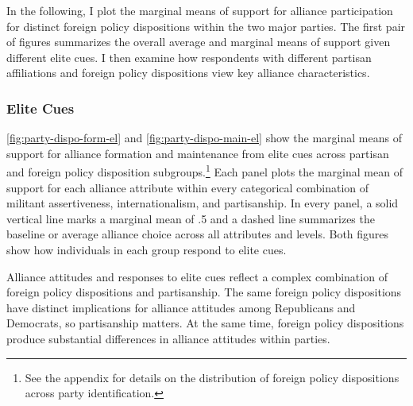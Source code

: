 \documentclass[12pt]{article}
\begin{document}
In the following, I plot the marginal means of support for alliance participation for distinct foreign policy dispositions within the two major parties.  
The first pair of figures summarizes the overall average and marginal means of support given different elite cues. 
I then examine how respondents with different partisan affiliations and foreign policy dispositions view key alliance characteristics. 


\subsubsection{Elite Cues}


\autoref{fig:party-dispo-form-el} and \autoref{fig:party-dispo-main-el} show the marginal means of support for alliance formation and maintenance from elite cues across partisan and foreign policy disposition subgroups.\footnote{See the appendix for details on the distribution of foreign policy dispositions across party identification.} 
Each panel plots the marginal mean of support for each alliance attribute within every categorical combination of militant assertiveness, internationalism, and partisanship.
In every panel, a solid vertical line marks a marginal mean of .5 and a dashed line summarizes the baseline or average alliance choice across all attributes and levels.  
Both figures show how individuals in each group respond to elite cues. 


Alliance attitudes and responses to elite cues reflect a complex combination of foreign policy dispositions and partisanship. 
The same foreign policy dispositions have distinct implications for alliance attitudes among Republicans and Democrats, so partisanship matters.
At the same time, foreign policy dispositions produce substantial differences in alliance attitudes within parties.  
\end{document}
